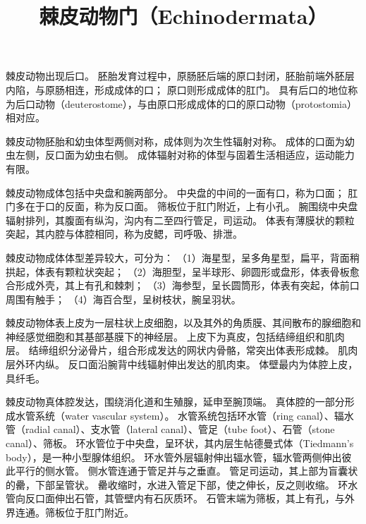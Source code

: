 \documentclass[11pt]{article}
\title{棘皮动物门（Echinodermata）}
\date{}
\begin{document}
  \maketitle

  \linenumbers
棘皮动物出现后口。
胚胎发育过程中，原肠胚后端的原口封闭，胚胎前端外胚层内陷，与原肠相连，形成成体的口；
原口则形成成体的肛门。
具有后口的地位称为后口动物（deuterostome），与由原口形成成体的口的原口动物（protostomia）相对应。

\newline

棘皮动物胚胎和幼虫体型两侧对称，成体则为次生性辐射对称。
成体的口面为幼虫左侧，反口面为幼虫右侧。
成体辐射对称的体型与固着生活相适应，运动能力有限。

\newline

棘皮动物成体包括中央盘和腕两部分。
中央盘的中间的一面有口，称为口面；
肛门多在于口的反面，称为反口面。
筛板位于肛门附近，上有小孔。
腕围绕中央盘辐射排列，其腹面有纵沟，沟内有二至四行管足，司运动。
体表有薄膜状的颗粒突起，其内腔与体腔相同，称为皮鳃，司呼吸、排泄。

\newline

棘皮动物成体体型差异较大，可分为：
（1）海星型，呈多角星型，扁平，背面稍拱起，体表有颗粒状突起；
（2）海胆型，呈半球形、卵圆形或盘形，体表骨板愈合形成外壳，其上有孔和棘刺；
（3）海参型，呈长圆筒形，体表有突起，体前口周围有触手；
（4）海百合型，呈树枝状，腕呈羽状。

\newline

棘皮动物体表上皮为一层柱状上皮细胞，以及其外的角质膜、其间散布的腺细胞和神经感觉细胞和其基部基膜下的神经层。
上皮下为真皮，包括结缔组织和肌肉层。
结缔组织分泌骨片，组合形成发达的网状内骨骼，常突出体表形成棘。
肌肉层外环内纵。
反口面沿腕背中线辐射伸出发达的肌肉束。
体壁最内为体腔上皮，具纤毛。

\newline

棘皮动物真体腔发达，围绕消化道和生殖腺，延申至腕顶端。
真体腔的一部分形成水管系统（water vascular system）。
水管系统包括环水管（ring canal）、辐水管（radial canal）、支水管（lateral canal）、管足（tube foot）、石管（stone canal）、筛板。
环水管位于中央盘，呈环状，其内层生帖德曼式体（Tiedmann’s body），是一种小型腺体组织。
环水管外层辐射伸出辐水管，辐水管两侧伸出彼此平行的侧水管。
侧水管连通于管足并与之垂直。
管足司运动，其上部为盲囊状的罍，下部呈管状。
罍收缩时，水进入管足下部，使之伸长，反之则收缩。
环水管向反口面伸出石管，其管壁内有石灰质环。
石管末端为筛板，其上有孔，与外界连通。筛板位于肛门附近。
\end{document}
